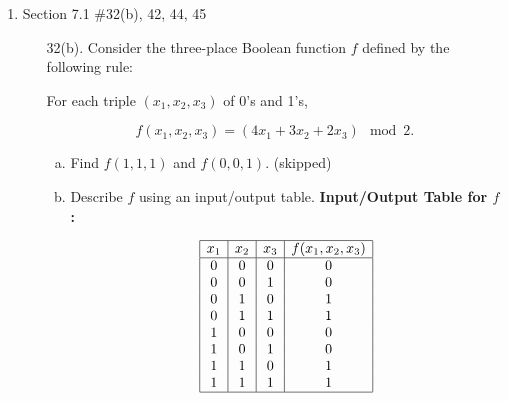 \documentclass[12pt]{article}
\begin{document}
\begin{enumerate}
\begin{enumerate}
\begin{enumerate}[a.]
                \end{enumerate}
        \end{enumerate}

    \newpage
    \item Section 7.1 \#32(b), 42, 44, 45
        \begin{enumerate}
            \item[32(b).]  Consider the three-place Boolean function $f$ defined by the following rule:
    
                For each triple $(x_1, x_2, x_3)$ of 0's and 1's,
                
                \[
                f(x_1, x_2, x_3) = (4x_1 + 3x_2 + 2x_3) \mod 2.
                \]
                
                \begin{enumerate}[a.]
                    \item Find $f(1,1,1)$ and $f(0,0,1)$. (skipped)
                    
                    \item Describe $f$ using an input/output table.
                    \textbf{Input/Output Table for $f$:}

                        \[
                        \begin{array}{|c|c|c|c|}
                        \hline
                        x_1 & x_2 & x_3 & f(x_1, x_2, x_3) \\
                        \hline
                        0 & 0 & 0 & 0 \\
                        0 & 0 & 1 & 0 \\
                        0 & 1 & 0 & 1 \\
                        0 & 1 & 1 & 1 \\
                        1 & 0 & 0 & 0 \\
                        1 & 0 & 1 & 0 \\
                        1 & 1 & 0 & 1 \\
                        1 & 1 & 1 & 1 \\
                        \hline
                        \end{array}
                        \]
                \end{enumerate}


\end{enumerate}
\end{enumerate}
\end{document}
